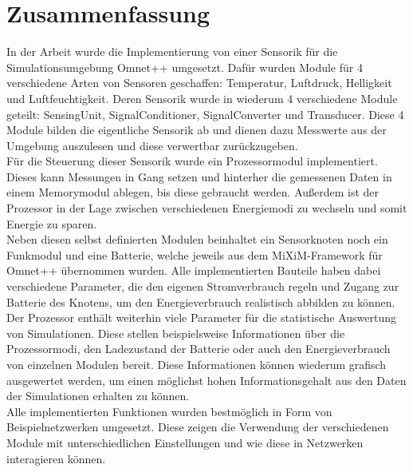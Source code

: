 \chapter{Zusammenfassung}

In der Arbeit wurde die Implementierung von einer Sensorik für die Simulationsumgebung Omnet++ umgesetzt. Dafür wurden Module für 4 verschiedene Arten von Sensoren geschaffen: Temperatur, Luftdruck, Helligkeit und Luftfeuchtigkeit. Deren Sensorik wurde in wiederum 4 verschiedene Module geteilt: SensingUnit, SignalConditioner, SignalConverter und Transducer. Diese 4 Module bilden die eigentliche Sensorik ab und dienen dazu Messwerte aus der Umgebung auszulesen und diese verwertbar zurückzugeben.\\
Für die Steuerung dieser Sensorik wurde ein Prozessormodul implementiert. Dieses kann Messungen in Gang setzen und hinterher die gemessenen Daten in einem Memorymodul ablegen, bis diese gebraucht werden. Außerdem ist der Prozessor in der Lage zwischen verschiedenen Energiemodi zu wechseln und somit Energie zu sparen.\\
Neben diesen selbst definierten Modulen beinhaltet ein Sensorknoten noch ein Funkmodul und eine Batterie, welche jeweils aus dem MiXiM-Framework für Omnet++ übernommen wurden. Alle implementierten Bauteile haben dabei verschiedene Parameter, die den eigenen Stromverbrauch regeln und Zugang zur Batterie des Knotens, um den Energieverbrauch realistisch abbilden zu können.\\
Der Prozessor enthält weiterhin viele Parameter für die statistische Auswertung von Simulationen. Diese stellen beispielsweise Informationen über die Prozessormodi, den Ladezustand der Batterie oder auch den Energieverbrauch von einzelnen Modulen bereit. Diese Informationen können wiederum grafisch ausgewertet werden, um einen möglichst hohen Informationsgehalt aus den Daten der Simulationen erhalten zu können.\\
Alle implementierten Funktionen wurden bestmöglich in Form von Beispielnetzwerken umgesetzt. Diese zeigen die Verwendung der verschiedenen Module mit unterschiedlichen Einstellungen und wie diese in Netzwerken interagieren können.